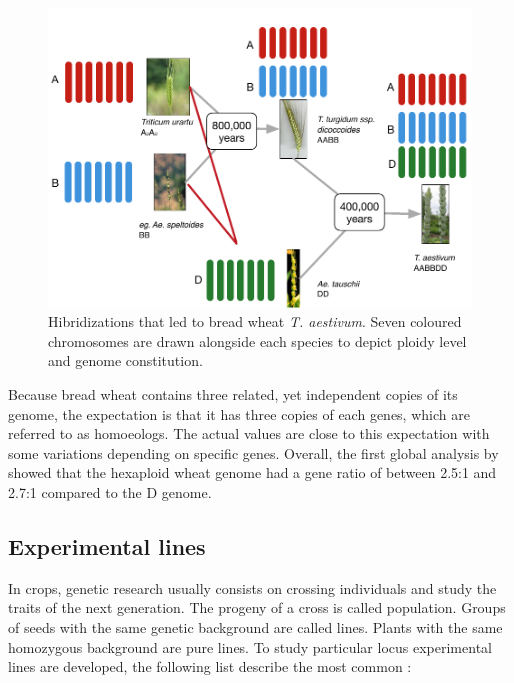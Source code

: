 \begin{figure}
  \includegraphics[width=1\textwidth]{LitReview/Figures/WheatPolyplodization.pdf}
  \caption{Hibridizations that led to bread wheat \textit{T. aestivum}. Seven coloured chromosomes are drawn alongside each species to depict ploidy level and genome constitution.  }
  \label{fig:lit:polyplody}
\end{figure}
Because bread wheat contains three related, yet independent copies of its genome, the expectation is that it has three copies of each genes, which are referred to as homoeologs.
The actual values are close to this expectation with some variations depending on specific genes.
Overall, the first global analysis by \citet{Brenchley2012} showed that the hexaploid wheat genome had a gene ratio of between 2.5:1 and 2.7:1 compared to the D genome.  




\subsection{Experimental lines}

In crops, genetic research usually consists on crossing individuals and study the traits of the next generation. 
The progeny of a cross is called population. 
Groups of seeds with the same genetic background are called lines. 
Plants with the same homozygous background are pure lines. 
To study particular locus experimental lines are developed, the following list describe the most common \citep{VanOoijen2013Intro}:

